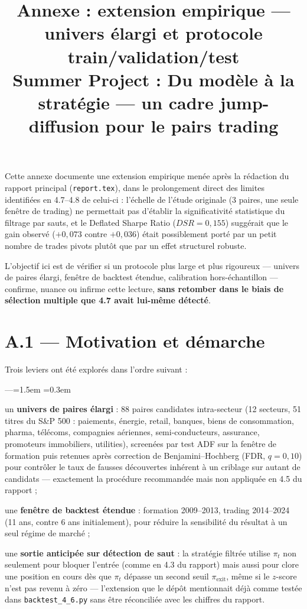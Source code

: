 \documentclass{article}
\date{}
\title{Annexe : extension empirique --- univers élargi et protocole train/validation/test\\
\large Summer Project : Du modèle à la stratégie --- un cadre jump-diffusion pour le pairs trading}
\begin{document}
\maketitle

Cette annexe documente une extension empirique menée après la rédaction du rapport principal (\texttt{report.tex}), dans le prolongement direct des limites identifiées en 4.7--4.8 de celui-ci : l'échelle de l'étude originale (3 paires, une seule fenêtre de trading) ne permettait pas d'établir la significativité statistique du filtrage par sauts, et le Deflated Sharpe Ratio ($DSR=0{,}155$) suggérait que le gain observé ($+0{,}073$ contre $+0{,}036$) était possiblement porté par un petit nombre de trades pivots plutôt que par un effet structurel robuste.

L'objectif ici est de vérifier si un protocole plus large et plus rigoureux --- univers de paires élargi, fenêtre de backtest étendue, calibration hors-échantillon --- confirme, nuance ou infirme cette lecture, \textbf{sans retomber dans le biais de sélection multiple que 4.7 avait lui-même détecté}.

\section*{A.1 --- Motivation et démarche}
Trois leviers ont été explorés dans l'ordre suivant :
\begin{list}{---}{\leftmargin=1.5em \itemsep=0.3em}
\item un \textbf{univers de paires élargi} : 88 paires candidates intra-secteur (12 secteurs, 51 titres du S\&P 500 : paiements, énergie, retail, banques, biens de consommation, pharma, télécoms, compagnies aériennes, semi-conducteurs, assurance, promoteurs immobiliers, utilities), screenées par test ADF sur la fenêtre de formation puis retenues après correction de Benjamini--Hochberg (FDR, $q=0{,}10$) pour contrôler le taux de fausses découvertes inhérent à un criblage sur autant de candidats --- exactement la procédure recommandée mais non appliquée en 4.5 du rapport ;
\item une \textbf{fenêtre de backtest étendue} : formation 2009--2013, trading 2014--2024 (11 ans, contre 6 ans initialement), pour réduire la sensibilité du résultat à un seul régime de marché ;
\item une \textbf{sortie anticipée sur détection de saut} : la stratégie filtrée utilise $\pi_t$ non seulement pour bloquer l'entrée (comme en 4.3 du rapport) mais aussi pour clore une position en cours dès que $\pi_t$ dépasse un second seuil $\pi_{\text{exit}}$, même si le $z$-score n'est pas revenu à zéro --- l'extension que le dépôt mentionnait déjà comme testée dans \texttt{backtest\_4\_6.py} sans être réconciliée avec les chiffres du rapport.
\end{list}
\end{document}
